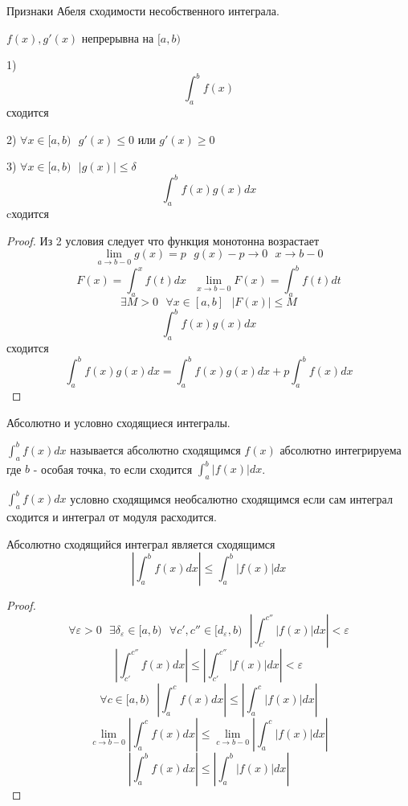 \begin{title}[\Large]
  Признаки Абеля сходимости несобственного интеграла.
\end{title}

\begin{theorem}
  $f(x),g'(x)$ непрерывна на $[a,b)$

  1) $$\int_a^b f(x)$$ сходится

  2) $\forall x \in [a,b) ~~~ g'(x) \le 0$ или $g'(x) \ge 0$

  3) $\forall x \in [a,b) ~~~ |g(x)| \le \delta$
  $$
  \int_a^b f(x)g(x)dx
  $$
  cходится
\end{theorem}

\begin{proof}
  Из 2 условия следует что функция монотонна возрастает
  $$
  \lim_{a \to b-0}g(x) = p ~~~ g(x) - p \to 0 ~~~ x \to b-0
  $$
  $$
  F(x) = \int_a^x f(t)dx ~~~ \lim_{x \to b-0} F(x) = \int_a^b f(t)dt
  $$
  $$
  \exists M > 0 ~~~ \forall x \in [a,b] ~~~ |F(x)| \le M
  $$
  $$
  \int_a^b f(x)g(x)dx
  $$
  сходится
  $$
  \int_a^b f(x)g(x)dx = \int_a^b f(x)g(x)dx + p\int_a^b f(x)dx
  $$
\end{proof}

\begin{title}[\Large]
  Абсолютно и условно сходящиеся интегралы.
\end{title}

\begin{defin}
  $\int_a^b f(x)dx$ называется абсолютно сходящимся $f(x)$ абсолютно
интегрируема где $b$ - особая точка, то если сходится $\int_a^b |f(x)|dx$.
\end{defin}

\begin{defin}
  $\int_a^b f(x)dx$ условно сходящимся необсалютно сходящимся если сам интеграл
сходится и интеграл от модуля расходится.
\end{defin}

\begin{theorem}
  Абсолютно сходящийся интеграл является сходящимся
  $$
  \left| \int_a^b f(x)dx \right| \le \int_a^b |f(x)|dx
  $$
\end{theorem}

\begin{proof}
  $$
  \forall \varepsilon > 0 ~~~ \exists \delta_{\varepsilon} \in [a,b) ~~~
  \forall c',c'' \in [d_{\varepsilon}, b) ~~~
  \left| \int_{c'}^{c''} |f(x)|dx \right| < \varepsilon
  $$
  $$
  \left| \int_{c'}^{c''} f(x)dx \right| \le
  \left| \int_{c'}^{c''} |f(x)|dx \right| < \varepsilon
  $$
  $$
  \forall c \in [a,b) ~~~ \left| \int_a^c f(x)dx \right| \le
  \left| \int_a^c |f(x)|dx \right|
  $$
  $$
  \lim_{c \to b-0} \left| \int_a^{c} f(x)dx \right| \le
  \lim_{c \to b-0} \left| \int_a^c |f(x)|dx \right|
  $$
  $$
  \left| \int_a^b f(x)dx \right| \le
  \left| \int_a^b |f(x)|dx \right|
  $$
\end{proof}

